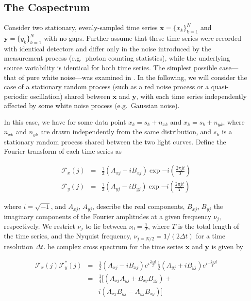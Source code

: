\documentclass[fleqn,usenatbib]{mnras}
\begin{document}
\subsection{The Cospectrum}

Consider two stationary, evenly-sampled time series $\mathbf{x} = \{x_k\}_{k=1}^N$ and $\mathbf{y} = \{y_k\}_{k=1}^N$ with no gaps. Further assume that these time series were recorded with identical detectors and differ only in the noise introduced by the measurement process (e.g.\ photon counting statistics), while the underlying source variability is identical for both time series. The simplest possible case---that of pure white noise---was examined in \citet{huppenkothen2018}. In the following, we will consider the case of a stationary random process (such as a red noise process or a quasi-periodic oscillation) shared between $\mathbf{x}$ and $\mathbf{y}$, with each time series independently affected by some white noise process (e.g.\ Gaussian noise). 

In this case, we have for some data point $x_k = s_k + n_{xk}$ and $x_k = s_k + n_{yk}$, where $n_{xk}$ and $n_{yk}$ are drawn independently from the same distribution, and $s_k$ is a stationary random process shared between the two light curves. Define the Fourier transform of each time series as

\begin{eqnarray}
\mathcal{F}_x(j) &=& \frac{1}{2}(A_{xj} - i B_{xj}) \exp{-i\left(\frac{2\pi j t}{T}\right)} \\
\mathcal{F}_y(j) &=& \frac{1}{2}(A_{yj} - i B_{yj}) \exp{-i\left(\frac{2\pi j t}{T}\right)}
\end{eqnarray}

\noindent where $i = \sqrt{-1}$, and $A_{xj}$, $A_{yj}$, describe the real components, $B_{xj}$, $B_{yj}$ the imaginary components of the Fourier amplitudes at a given frequency $\nu_j$, respectively. We restrict $\nu_j$ to lie between $\nu_0 = \frac{1}{T}$, where $T$ is the total length of the time series, and the Nyquist frequency, $\nu_{j=N/2} = 1/(2\Delta t)$ for a time resolution $\Delta t$. 
he complex cross spectrum for the time series $\mathbf{x}$ and $\mathbf{y}$ is given by

\begin{eqnarray}
\label{eqn:crossspectrum}
\mathcal{F}_x(j) \mathcal{F}_y^*(j) & = & \frac{1}{2} (A_{xj} - i B_{xj}) e^{i \frac{2 \pi j t}{T}} \frac{1}{2} (A_{yj} + i B_{yj}) e^{i \frac{-2 \pi j t}{T}}\nonumber \\ 
		     & = & \frac{1}{4} [ (A_{xj}A_{yj} + B_{xj}B_{yj}) + \\\nonumber
		     & &  i (A_{xj}B_{yj} - A_{yj}B_{xj}) ]
\end{eqnarray}
\end{document}
